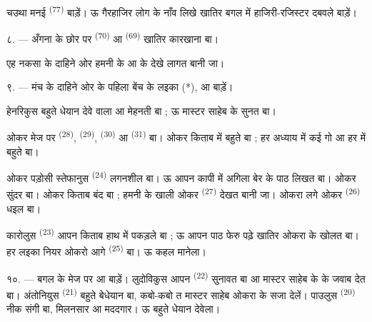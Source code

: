 चउथा मनई  \textsuperscript{(77)} बाड़ें। ऊ गैरहाजिर लोग के
नाँव लिखे खातिर बगल में हाजिरी-रजिस्टर दबवले बाड़ें।

८. --- अँगना के छोर पर  \textsuperscript{(70)} आ
 \textsuperscript{(69)} खातिर कारखाना बा।

एह नकसा के दाहिने ओर हमनी के  आ  के
 देखे लागत बानी जा।


\VUsaut{2.4mm}

\VUsaut{3.0mm}

९. --- मंच के दाहिने ओर के पहिला बेंच के लइका  (*),
 आ  बाड़ें।

हेनरिकुस बहुते धेयान देवे वाला आ मेहनती बा ; ऊ मास्टर साहेब के सुनत बा।

ओकर मेज पर  \textsuperscript{(28)}, 
\textsuperscript{(29)},  \textsuperscript{(30)} आ
 \textsuperscript{(31)} बा। ओकर किताब में बहुते
 बा ; हर अध्याय में कई गो  आ हर
 में बहुते  बा।

ओकर पड़ोसी स्तेफानुस \textsuperscript{(24)} लगनशील बा। ऊ आपन कापी में
अगिला बेर के पाठ लिखत बा। ओकर  सुंदर बा। ओकर किताब बंद
बा ; हमनी के खाली ओकर  \textsuperscript{(27)} देखत बानी
जा। ओकरा लगे ओकर  \textsuperscript{(26)} धइल बा।

कारोलुस \textsuperscript{(23)} आपन किताब हाथ में पकड़ले बा ; ऊ आपन पाठ
फेरु पढ़े खातिर ओकरा के खोलत बा। हर लइका नियर ओकरो आगे 
\textsuperscript{(25)} बा। ऊ कहल मानेला।

१०. --- बगल के मेज पर  आ 
बाड़ें। लुदोविकुस आपन  \textsuperscript{(22)} सुनावत बा आ
मास्टर साहेब के  के जवाब देत बा। अंतोनियुस
\textsuperscript{(21)} बहुते बेधेयान बा, कबो-कबो त मास्टर साहेब ओकरा के
सजा देलें। पाउलुस \textsuperscript{(20)} नीक संगी बा, मिलनसार आ मददगार।
ऊ बहुते धेयान देवेला।

